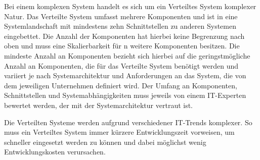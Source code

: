 Bei einem komplexen System handelt es sich um ein Verteiltes System komplexer Natur. Das Verteilte System umfasst mehrere Komponenten und ist in eine Systemlandschaft mit mindestens zehn Schnittstellen zu anderen Systemen eingebettet. Die Anzahl der Komponenten hat hierbei keine Begrenzung nach oben und muss eine Skalierbarkeit für n weitere Komponenten besitzen. Die mindeste Anzahl an Komponenten bezieht sich hierbei auf die geringstmögliche Anzahl an Komponenten, die für das Verteilte System benötigt werden und variiert je nach Systemarchitektur und Anforderungen an das System, die von dem jeweiligen Unternehmen definiert wird. Der Umfang an Komponenten, Schnittstellen und Systemabhängigkeiten muss jeweils von einem IT-Experten bewertet werden, der mit der Systemarchitektur vertraut ist. 

Die Verteilten Systeme werden aufgrund verschiedener IT-Trends komplexer. So muss ein Verteiltes System immer kürzere Entwicklungszeit vorweisen, um schneller eingesetzt werden zu können und dabei möglichst wenig Entwicklungskosten verursachen. \cite{vorossanchez:2003}